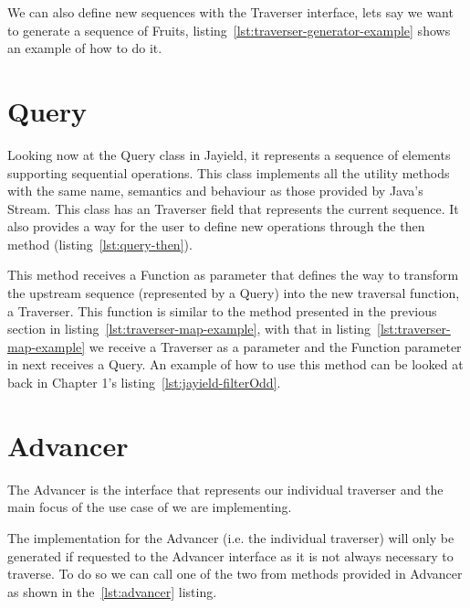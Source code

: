 

\newpage
We can also define new sequences with the Traverser interface, lets say we want to generate a sequence of Fruits, listing~\ref{lst:traverser-generator-example} shows an example of how to do it.



\section{Query}

Looking now at the Query class in Jayield, it represents a sequence of elements supporting sequential operations. This class implements all the utility methods with the same name, semantics and behaviour as those provided by Java's Stream. This class has an Traverser field that represents the current sequence. It also provides a way for the user to define new operations through the then method (listing~\ref{lst:query-then}).



 This method receives a Function as parameter that defines the way to transform the upstream sequence (represented by a Query) into the new traversal function, a Traverser. This function is similar to the method presented in the previous section in listing~\ref{lst:traverser-map-example}, with that in listing~\ref{lst:traverser-map-example} we receive a Traverser as a parameter and the Function parameter in next receives a Query. An example of how to use this method can be looked at back in Chapter 1's listing~\ref{lst:jayield-filterOdd}.

\section{Advancer}

The Advancer is the interface that represents our individual traverser and the main focus of the use case of we are implementing.

The implementation for the Advancer (i.e. the individual traverser) will only be generated if requested to the Advancer interface as it is not always necessary to traverse. To do so we can call one of the two from methods provided in Advancer as shown in the~\ref{lst:advancer} listing.

